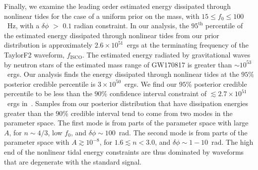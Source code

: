 Finally, we examine the leading order estimated energy dissipated through nonlinear tides for the case of a uniform prior on the mass, with $15 \leq f_0 \leq 100$~Hz, with a $\delta \phi$ $>$ $0.1$ radian constraint. In our analysis, the $95^{\mathrm{th}}$ percentile of the estimated energy dissipated through nonlinear tides from our prior distribution is approximately $2.6 \times 10^{51}$~ergs at the terminating frequency of the TaylorF2 waveform, $f_\mathrm{ISCO}$. The estimated energy radiated by gravitational waves by neutron stars of the estimated mass range of GW170817 is greater than $\sim 10^{53}$~ergs. Our analysis finds the energy dissipated through nonlinear tides at the $95\%$ posterior credible percentile is $3 \times 10^{50}$~ergs. We find our $95\%$ posterior credible percentile to be less than the $90\%$ confidence interval constraint of $\lesssim 2.7 \times 10^{51}$~ergs in~\cite{abbott2019constraining}. Samples from our posterior distribution that have dissipation energies greater than the $90$\% credible interval tend to come from two modes in the parameter space. The first mode is from parts of the parameter space with large $A$, for $n \sim 4/3$, low $f_0$, and $\delta \phi \sim 100$~rad. The second mode is from parts of the parameter space with $A \gtrsim 10^{-8}$, for $1.6 \lesssim n < 3.0$, and $\delta \phi \sim 1-10$~rad. The high end of the nonlinear tidal energy constraints are thus dominated by waveforms that are degenerate with the standard signal.

